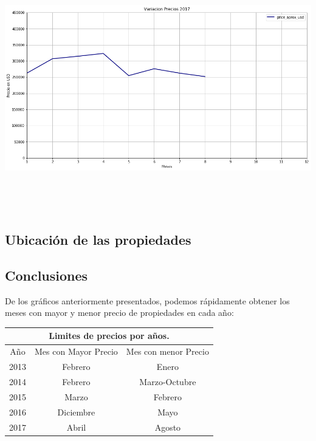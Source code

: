 \documentclass[a4paper, 10pt]{article}
\begin{document}
        \begin{center}
       				\includegraphics[width=6in, height=4.2in]{images/variacion2017}
		   	\end{center}

      \subsection{Ubicación de las propiedades}



      \subsection{Conclusiones}

      De los gráficos anteriormente presentados, podemos rápidamente obtener los meses con mayor y menor precio de propiedades en cada año:

      \begin{center}
        \begin{tabular}{ |c|c|c| }
          \hline
          \multicolumn{3}{|c|}{Limites de precios por años.}\\
          \hline
          \hline
          Año & Mes con Mayor Precio & Mes con menor Precio \\
          \hline
          2013 & Febrero & Enero \\
          2014 & Febrero & Marzo-Octubre \\
          2015 & Marzo & Febrero \\
          2016 & Diciembre & Mayo \\
          2017 & Abril & Agosto \\

          \hline
        \end{tabular}
      \end{center}
\end{document}
